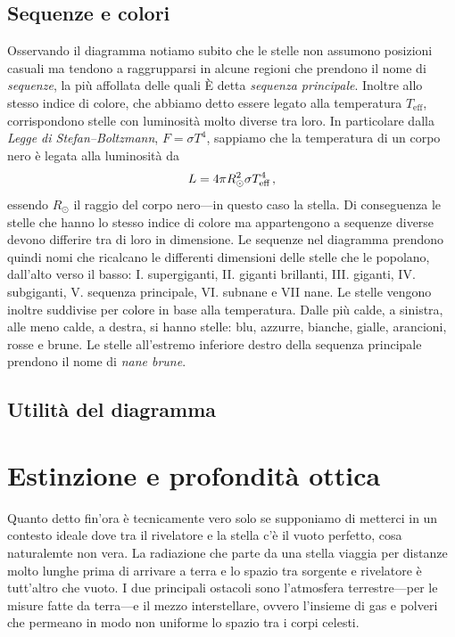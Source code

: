     \subsection{Sequenze e colori}
        Osservando il diagramma notiamo subito che le stelle non assumono posizioni casuali ma tendono a raggrupparsi in alcune regioni che prendono il nome di \emph{sequenze}, la più affollata delle quali È detta \emph{sequenza principale}. Inoltre allo stesso indice di colore, che abbiamo detto essere legato alla temperatura $T_\text{eff}$, corrispondono stelle con luminosità molto diverse tra loro. In particolare dalla \emph{Legge di Stefan--Boltzmann}, $F = \sigma T^4$, sappiamo che la temperatura di un corpo nero è legata alla luminosità da
        \begin{equation}
            L = 4\pi R^2_\odot \sigma T^4_\text{eff}
            \,,
        \end{equation}
        essendo $R_\odot$ il raggio del corpo nero---in questo caso la stella. Di conseguenza le stelle che hanno lo stesso indice di colore ma appartengono a sequenze diverse devono differire tra di loro in dimensione. Le sequenze nel diagramma prendono quindi nomi che ricalcano le differenti dimensioni delle stelle che le popolano, dall'alto verso il basso: I. supergiganti, II. giganti brillanti, III. giganti, IV. subgiganti, V. sequenza principale, VI. subnane e VII nane. Le stelle vengono inoltre suddivise per colore in base alla temperatura. Dalle più calde, a sinistra, alle meno calde, a destra, si hanno stelle: blu, azzurre, bianche, gialle, arancioni, rosse e brune. Le stelle all'estremo inferiore destro della sequenza principale prendono il nome di \emph{nane brune}.
    \subsection{Utilità del diagramma \hr}
\section{Estinzione e profondità ottica}
    Quanto detto fin'ora è tecnicamente vero solo se supponiamo di metterci in un contesto ideale dove tra il rivelatore e la stella c'è il vuoto perfetto, cosa naturalemte non vera. La radiazione che parte da una stella viaggia per distanze molto lunghe prima di arrivare a terra e lo spazio tra sorgente e rivelatore è tutt'altro che vuoto. I due principali ostacoli sono l'atmosfera terrestre---per le misure fatte da terra---e il mezzo interstellare, ovvero l'insieme di gas e polveri che permeano in modo non uniforme lo spazio tra i corpi celesti.

